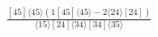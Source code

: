 \documentclass[varwidth, border=5pt]{standalone}
\begin{document}
\begin{my}
$\begin{gathered}
\scriptscriptstyle\frac{[45]⟨45⟩(1[45]⟨45⟩-2⟨24⟩[24])}{⟨15⟩[24]⟨34⟩[34]⟨35⟩}
\end{gathered}$
\end{my}
\end{document}

